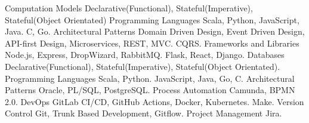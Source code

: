   \begin{cvskills}
    \cvskill
      {Computation Models} %
      { Declarative(Functional), Stateful(Imperative), Stateful(Object Orientated)} %
    \cvskill
      {Programming Languages} %
      {  Scala, Python, JavaScript, Java.}
    \cvskill
      {} %
      {  C, Go.}
    \cvskill
      {Architectural Patterns} %
      {  Domain Driven Design, Event Driven Design, API-first Design, Microservices, REST, MVC.}
    \cvskill
      {} %
      {  CQRS.}
    \cvskill
      {Frameworks and Libraries} %
      {  Node.js, Express, DropWizard, RabbitMQ.}
    \cvskill
      {}
      {  Flask, React, Django.}
    \cvskill
    {Databases} %
    { Declarative(Functional), Stateful(Imperative), Stateful(Object Orientated).} 
  \cvskill
    {Programming Languages} %
    {  Scala, Python.}
  \cvskill
    {} %
    {  JavaScript, Java, Go, C.}
  \cvskill
    {Architectural Patterns} %
    {  Oracle, PL/SQL, PostgreSQL.}
    \cvskill
      {Process Automation}
      { Camunda, BPMN 2.0.}
    \cvskill
    {DevOps} %
      { GitLab CI/CD, GitHub Actions, Docker, Kubernetes.} %
    \cvskill
      {} %
      {  Make.}
    \cvskill
    {Version Control} %
    { Git, Trunk Based Development, Gitflow.} %
    \cvskill
    {Project Management} %
    { Jira.} %
  \end{cvskills}
